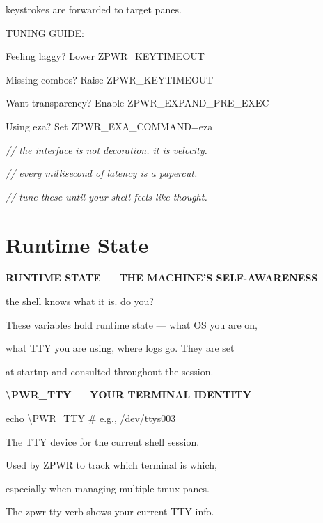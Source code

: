\documentclass[11pt,a4paper,twoside]{book}
\begin{document}
keystrokes are forwarded to target panes.

TUNING GUIDE:

Feeling laggy?       Lower ZPWR\_KEYTIMEOUT

Missing combos?      Raise ZPWR\_KEYTIMEOUT

Want transparency?   Enable ZPWR\_EXPAND\_PRE\_EXEC

\begin{codebox}
Using eza?           Set ZPWR\_EXA\_COMMAND=eza\\
\end{codebox}

{\small\itshape\color{dimtext} // the interface is not decoration. it is velocity.}

{\small\itshape\color{dimtext} // every millisecond of latency is a papercut.}

{\small\itshape\color{dimtext} // tune these until your shell feels like thought.}


\vspace{16pt}

\section{Runtime State}


\vspace{10pt}
{\large\bfseries\color{neoncyan} RUNTIME STATE — THE MACHINE'S SELF-AWARENESS}\vspace{6pt}

the shell knows what it is. do you?

These variables hold runtime state — what OS you are on,

what TTY you are using, where logs go. They are set

at startup and consulted throughout the session.


\vspace{12pt}
{\bfseries\color{neonyellow} \textbackslash{}PWR\_TTY — YOUR TERMINAL IDENTITY}\vspace{4pt}

echo \textbackslash{}PWR\_TTY   \# e.g., /dev/ttys003

The TTY device for the current shell session.

Used by ZPWR to track which terminal is which,

especially when managing multiple tmux panes.

\begin{codebox}
The zpwr tty verb shows your current TTY info.\\
\end{codebox}
\end{document}
